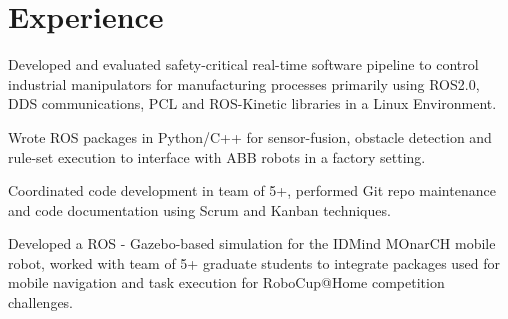 \documentclass[letterpaper]{deedy-resume} %
\begin{document}
\begin{minipage}[t]{0.73\textwidth} %

\section{Experience}


\vspace{\topsep} %
\begin{tightitemize}
\item Developed and evaluated safety-critical real-time software pipeline to control industrial manipulators for manufacturing processes primarily using ROS2.0, DDS communications, PCL and ROS-Kinetic libraries in a Linux Environment.
\item Wrote ROS packages in Python/C++ for sensor-fusion, obstacle detection and rule-set execution to interface with ABB robots in a factory setting.
\item Coordinated code development in team of 5+, performed Git repo maintenance and code documentation using Scrum and Kanban techniques.
\end{tightitemize}

\sectionspace %


\newline
{}

\begin{tightitemize}
\item Developed a ROS - Gazebo-based simulation for the IDMind MOnarCH mobile robot, worked with team of 5+ graduate students to integrate packages used for mobile navigation and task execution for RoboCup@Home competition challenges.
\end{tightitemize}


\end{minipage}
\end{document}
